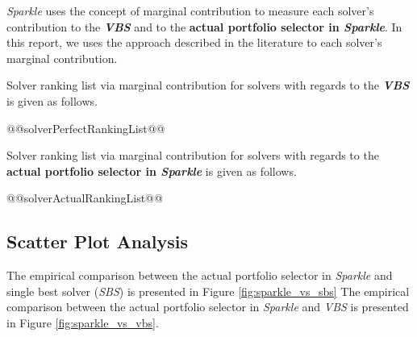 \documentclass[british]{article}
\begin{document}
\emph{Sparkle} uses the concept of marginal contribution \cite{XuEtAl12} to measure each solver's contribution to the \textbf{\emph{VBS}} and to the \textbf{actual portfolio selector in \emph{Sparkle}}. In this report, we uses the approach described in the literature \cite{FreEtAl16} to each solver's marginal contribution.

Solver ranking list via marginal contribution \cite{XuEtAl12} for solvers with regards to the \textbf{{\em VBS}} is given as follows.

\begin{enumerate} 
@@solverPerfectRankingList@@
\end{enumerate}

Solver ranking list via marginal contribution \cite{XuEtAl12} for solvers with regards to the \textbf{actual portfolio selector in \emph{Sparkle}} is given as follows.

\begin{enumerate} 
@@solverActualRankingList@@
\end{enumerate}


\subsection{Scatter Plot Analysis}

The empirical comparison between the actual portfolio selector in \emph{Sparkle} and single best solver (\emph{SBS}) is presented in Figure \ref{fig:sparkle_vs_sbs}
The empirical comparison between the actual portfolio selector in \emph{Sparkle} and \emph{VBS} is presented in Figure \ref{fig:sparkle_vs_vbs}.


%
\end{document}
